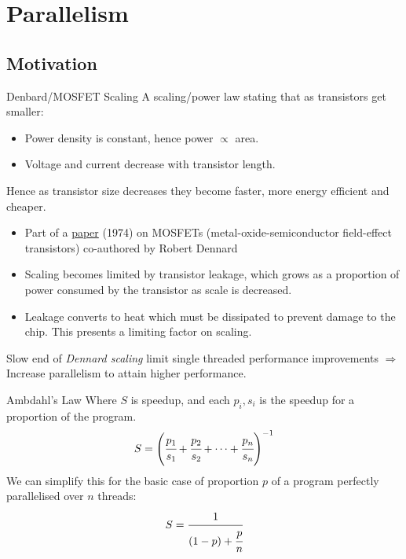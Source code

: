 \chapter{Parallelism}
\section{Motivation}
\begin{definitionbox}{Denbard/MOSFET Scaling}
    A scaling/power law stating that as transistors get smaller:
    \begin{itemize}
        \item Power density is constant, hence power $\varpropto$ area.
        \item Voltage and current decrease with transistor length.
    \end{itemize}
    Hence as transistor size decreases they become faster, more energy efficient and cheaper.
    \begin{itemize}
        \item Part of a \href{https://ieeexplore.ieee.org/document/1050511}{paper} (1974) on MOSFETs (metal-oxide-semiconductor field-effect transistors) co-authored by Robert Dennard
        \item Scaling becomes limited by transistor leakage, which grows as a proportion of power consumed by the transistor as scale is decreased.
        \item Leakage converts to heat which must be dissipated to prevent damage to the chip. This presents a limiting factor on scaling.
    \end{itemize}
\end{definitionbox}
\noindent
Slow end of \textit{Dennard scaling} limit single threaded performance improvements $\Rightarrow$ Increase parallelism to attain higher performance.

\begin{definitionbox}{Ambdahl's Law}
    Where $S$ is speedup, and each $p_i, s_i$ is the speedup for a proportion of the program.
    \[S = \left(\cfrac{p_1}{s_1} + \cfrac{p_2}{s_2} + \dots + \cfrac{p_n}{s_n}\right)^{-1}\]
    We can simplify this for the basic case of proportion $p$ of a program perfectly parallelised over $n$ threads:
    \[S = \cfrac{1}{(1-p) + \cfrac{p}{n}}\]
\end{definitionbox}

